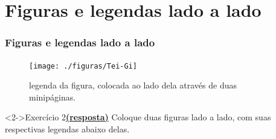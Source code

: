 \documentclass[handout,10pt]{beamer}
\begin{document}
\section{Figuras e legendas lado a lado}
\begin{frame}[fragile]
	\frametitle{Figuras e legendas lado a lado}
	
	\begin{atividade}{6}
		\begin{LaTeXcode}
			\begin{figure}
			  \begin{minipage}[b]{0.4\textwidth}
			    \texttt{[image: ./figuras/Tei-Gi]}
			  \end{minipage}\hfill
			  \begin{minipage}[b]{0.5\textwidth}
			    \caption{legenda da figura, colocada ao lado dela através
			             de duas minipáginas.}
			    \label{fig:minipage}
			  \end{minipage}
			\end{figure}
		\end{LaTeXcode}
	\end{atividade}
	
	\begin{block}<2->{Exercício 2\hyperlink{respostas}{\footnotesize\textbf{(resposta)}}}
		Coloque duas figuras lado a lado, com suas respectivas legendas abaixo delas.
	\end{block}
	
\end{frame}
\end{document}
